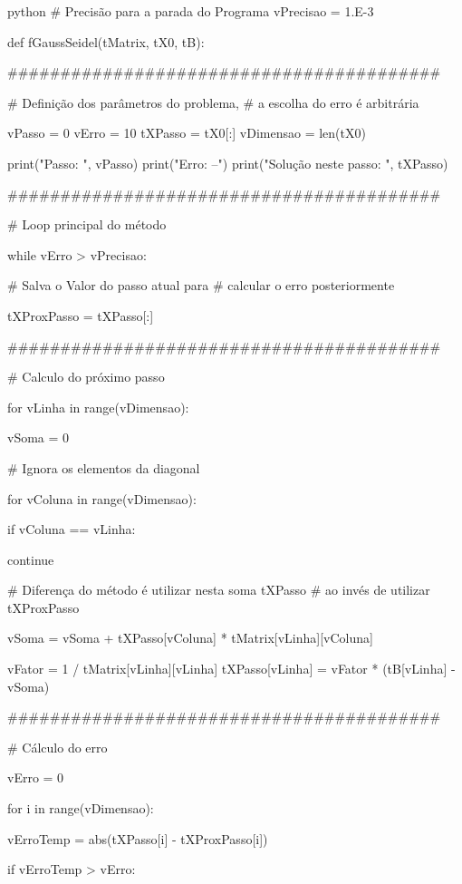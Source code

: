 \documentclass[twoside]{amsart}
\numberwithin{equation}{section}
\begin{document}
\begin{mintedbox}{python}
# Precisão para a parada do Programa
vPrecisao = 1.E-3

def fGaussSeidel(tMatrix, tX0, tB):

    #########################################

    # Definição dos parâmetros do problema,
    # a escolha do erro é arbitrária

    vPasso = 0
    vErro = 10
    tXPasso = tX0[:]
    vDimensao = len(tX0)

    print("Passo: ", vPasso)
    print("Erro: --")
    print("Solução neste passo: ", tXPasso)

    #########################################

    # Loop principal do método

    while vErro > vPrecisao:

    # Salva o Valor do passo atual para 
    # calcular o erro posteriormente

        tXProxPasso = tXPasso[:]

    #########################################

    # Calculo do próximo passo

        for vLinha in range(vDimensao):

            vSoma = 0

    # Ignora os elementos da diagonal

            for vColuna in range(vDimensao):

                if vColuna == vLinha:

                    continue

    # Diferença do método é utilizar nesta soma tXPasso
    # ao invés de utilizar tXProxPasso

                vSoma = vSoma + tXPasso[vColuna] * tMatrix[vLinha][vColuna]

            vFator = 1 / tMatrix[vLinha][vLinha]
            tXPasso[vLinha] = vFator * (tB[vLinha] - vSoma)

    #########################################

    # Cálculo do erro

        vErro = 0

        for i in range(vDimensao):

            vErroTemp = abs(tXPasso[i] - tXProxPasso[i])

            if vErroTemp > vErro:


\end{mintedbox}
\end{document}
